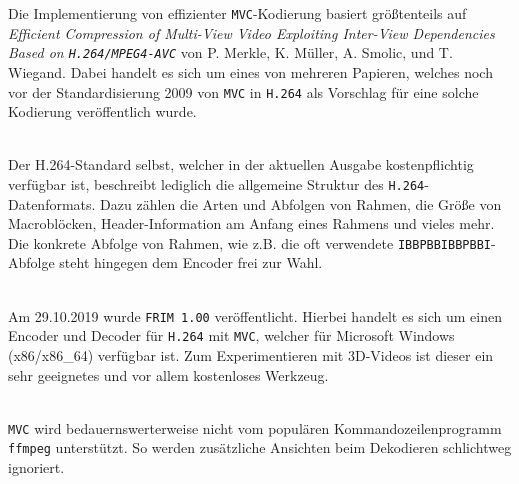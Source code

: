 Die Implementierung von effizienter \texttt{MVC}-Kodierung basiert gr\"o{\ss}tenteils auf
\textit{Efficient Compression of Multi-View Video Exploiting Inter-View Dependencies Based on \texttt{H.264/MPEG4-AVC}}
von P. Merkle, K. M\"uller, A. Smolic, und T. Wiegand\cite{paper}.
Dabei handelt es sich um eines von mehreren Papieren, welches noch vor der Standardisierung 2009\cite{mvc} von
\texttt{MVC} in \texttt{H.264} als Vorschlag f\"ur eine solche Kodierung ver\"offentlich wurde.

\noindent\\ Der H.264-Standard selbst\cite{h264}, welcher in der aktuellen Ausgabe kostenpflichtig verf\"ugbar ist, beschreibt
lediglich die allgemeine Struktur des \texttt{H.264}-Datenformats.
Dazu z\"ahlen die Arten und Abfolgen von Rahmen, die Gr\"o{\ss}e von Macrobl\"ocken, Header-Information am Anfang eines
Rahmens und vieles mehr.
Die konkrete Abfolge von Rahmen, wie z.B. die oft verwendete \texttt{IBBPBBIBBPBBI}-Abfolge\cite{frame-order} steht
hingegen dem Encoder frei zur Wahl.

\noindent\\ Am 29.10.2019 wurde \texttt{FRIM 1.00}\cite{frim} ver\"offentlicht.
Hierbei handelt es sich um einen Encoder und Decoder f\"ur \texttt{H.264} mit \texttt{MVC}, welcher f\"ur
Microsoft Windows (x86/x86\_64) verf\"ugbar ist.
Zum Experimentieren mit 3D-Videos ist dieser ein sehr geeignetes und vor allem kostenloses Werkzeug.

\noindent\\ \texttt{MVC} wird bedauernswerterweise nicht vom popul\"aren Kommandozeilenprogramm \texttt{ffmpeg}\cite{
ffmpeg}
unterst\"utzt.
So werden zus\"atzliche Ansichten beim Dekodieren schlichtweg ignoriert.


